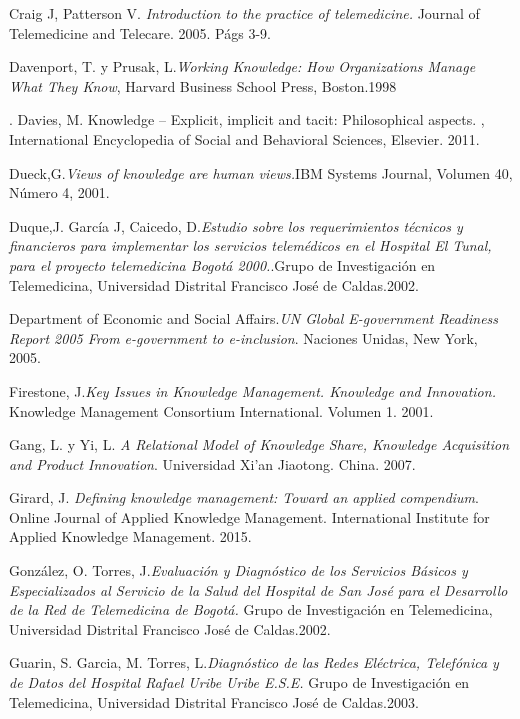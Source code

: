 \begin{thebibliography}{}
 Craig J, Patterson V. \textit{Introduction to the practice of telemedicine.} Journal of Telemedicine and Telecare. 2005. Págs 3-9.

 Davenport, T. y Prusak, L.\textit{Working Knowledge: How Organizations Manage What They Know}, Harvard Business School Press, Boston.1998

. Davies, M. Knowledge – Explicit, implicit and tacit: Philosophical aspects. , International Encyclopedia of Social and Behavioral Sciences, Elsevier. 2011.

 Dueck,G.\textit{Views of knowledge are human views.}IBM Systems Journal, Volumen 40, Número 4, 2001.

 Duque,J. García J, Caicedo, D.\textit{Estudio sobre los requerimientos técnicos y financieros para implementar los servicios telemédicos en el Hospital El Tunal,  para el proyecto telemedicina Bogotá 2000.}.Grupo de Investigación en Telemedicina,  Universidad Distrital Francisco José de Caldas.2002.

 Department of Economic and Social Affairs.\textit{UN Global E-government Readiness Report 2005 From e-government to e-inclusion}. Naciones Unidas, New York, 2005.

 Firestone, J.\textit{Key Issues in Knowledge Management. Knowledge and Innovation.} Knowledge Management Consortium International. Volumen 1. 2001.

 Gang, L. y Yi, L. \textit{A Relational Model of Knowledge Share, Knowledge Acquisition and Product Innovation}. Universidad Xi'an Jiaotong. China. 2007.

 Girard, J. \textit{Defining knowledge management: Toward an applied compendium}. Online Journal of Applied Knowledge Management. International Institute for Applied Knowledge Management. 2015.

 González, O. Torres, J.\textit{Evaluación y Diagnóstico de los Servicios Básicos y Especializados al Servicio de la Salud del Hospital de San José para el Desarrollo de la Red de Telemedicina de Bogotá.} Grupo de Investigación en Telemedicina, Universidad Distrital Francisco José de Caldas.2002.

 Guarin, S. Garcia, M. Torres, L.\textit{Diagnóstico de las Redes Eléctrica, Telefónica y de Datos del Hospital Rafael Uribe Uribe E.S.E.} Grupo de Investigación en Telemedicina,  Universidad Distrital Francisco José de Caldas.2003.


\end{thebibliography}
